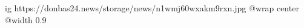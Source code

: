  
 
 
 
 

\ifcmt
  ig https://donbas24.news/storage/news/n1wmj60wxakm9rxn.jpg
  @wrap center
  @width 0.9
\fi
